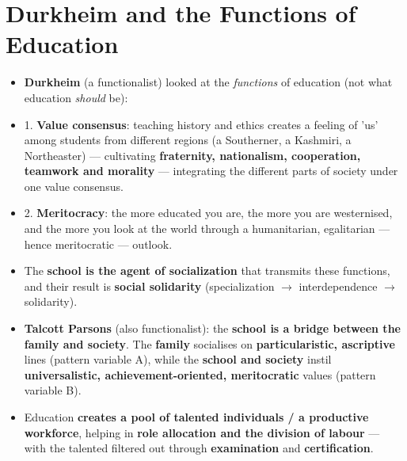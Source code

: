 \section{Durkheim and the Functions of Education}

\begin{KeyConcept}
\begin{itemize}
\item \textbf{Durkheim} (a functionalist) looked at the \emph{functions} of education (not what education \emph{should} be):
\item 1. \textbf{Value consensus}: teaching history and ethics creates a feeling of 'us' among students from different regions (a Southerner, a Kashmiri, a Northeaster) --- cultivating \textbf{fraternity, nationalism, cooperation, teamwork and morality} --- integrating the different parts of society under one value consensus.
\item 2. \textbf{Meritocracy}: the more educated you are, the more you are westernised, and the more you look at the world through a humanitarian, egalitarian --- hence meritocratic --- outlook.
\item The \textbf{school is the agent of socialization} that transmits these functions, and their result is \textbf{social solidarity} (specialization $\rightarrow$ interdependence $\rightarrow$ solidarity).
\end{itemize}
\end{KeyConcept}

\begin{KeyConcept}
\begin{itemize}
\item \textbf{Talcott Parsons} (also functionalist): the \textbf{school is a bridge between the family and society}. The \textbf{family} socialises on \textbf{particularistic, ascriptive} lines (pattern variable A), while the \textbf{school and society} instil \textbf{universalistic, achievement-oriented, meritocratic} values (pattern variable B).
\item Education \textbf{creates a pool of talented individuals / a productive workforce}, helping in \textbf{role allocation and the division of labour} --- with the talented filtered out through \textbf{examination} and \textbf{certification}.
\end{itemize}
\end{KeyConcept}

